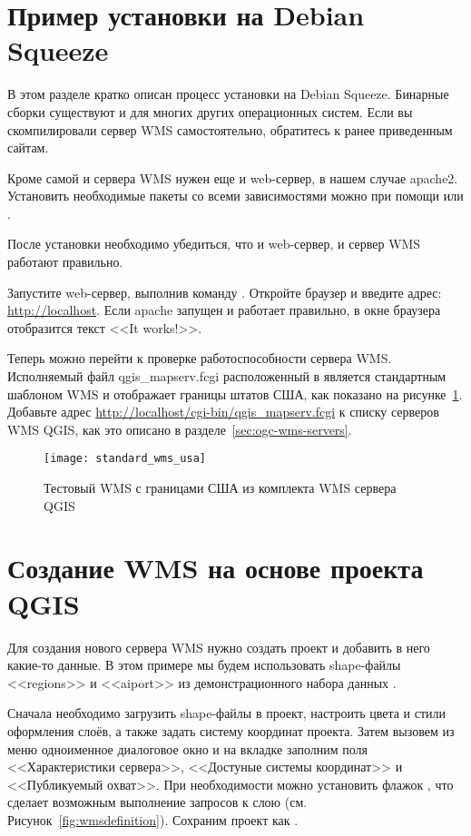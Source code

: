 \section{Пример установки на Debian Squeeze}

В этом разделе кратко описан процесс установки на Debian Squeeze. Бинарные
сборки существуют и для многих других операционных систем. Если вы скомпилировали
сервер WMS самостоятельно, обратитесь к ранее приведенным сайтам.

Кроме самой \qg и сервера WMS нужен еще и web-сервер, в нашем случае apache2.
Установить необходимые пакеты со всеми зависимостями можно при помощи
 или .

После установки необходимо убедиться, что и web-сервер, и сервер WMS работают
правильно.

Запустите web-сервер, выполнив команду .
Откройте браузер и введите адрес: \url{http://localhost}. Если apache
запущен и работает правильно, в окне браузера отобразится текст <<It works!>>.

Теперь можно перейти к проверке работоспособности сервера WMS. Исполняемый
файл qgis\_mapserv.fcgi расположенный в 
является стандартным шаблоном WMS и отображает границы штатов США, как
показано на рисунке~\ref{fig:usa_wms}. Добавьте адрес \url{http://localhost/cgi-bin/qgis\_mapserv.fcgi}
к списку серверов WMS QGIS, как это описано в разделе~\ref{sec:ogc-wms-servers}.

\begin{figure}[ht]
\centering
\texttt{[image: standard\_wms\_usa]}
\caption{Тестовый WMS с границами США из комплекта WMS сервера QGIS\nixcaption}
\label{fig:usa_wms}
\end{figure}

\section{Создание WMS на основе проекта QGIS}

Для создания нового сервера WMS нужно создать проект \qg и добавить в него
какие-то данные. В этом примере мы будем использовать shape-файлы <<regions>>
и <<aiport>> из демонстрационного набора данных \qg.

Сначала необходимо загрузить shape-файлы в проект, настроить цвета и стили
оформления слоёв, а также задать систему координат проекта. Затем вызовем
из меню  \arrow {}
одноименное диалоговое окно и на вкладке  заполним поля
<<Характеристики сервера>>, <<Достуные системы координат>> и <<Публикуемый
охват>>. При необходимости можно установить флажок
, что сделает
возможным выполнение запросов к слою (см. Рисунок~\ref{fig:wmsdefinition}).
Сохраним проект как .

